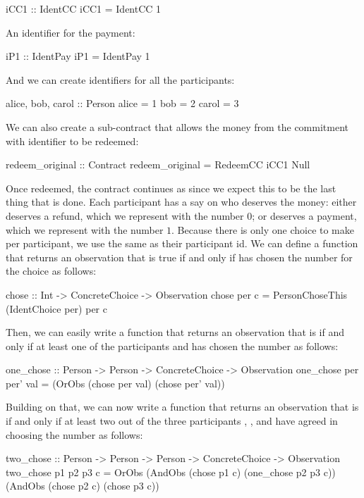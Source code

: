 \documentclass[runningheads]{llncs}
\begin{document}
\begin{haskellcode}
iCC1 :: IdentCC
iCC1 = IdentCC 1
\end{haskellcode}
An identifier for the payment:
\begin{haskellcode}
iP1 :: IdentPay
iP1 = IdentPay 1
\end{haskellcode}
And we can create identifiers for all the participants:
\begin{haskellcode}
alice, bob, carol :: Person
alice = 1
bob   = 2
carol = 3
\end{haskellcode}
We can also create a sub-contract that allows the money from the commitment with identifier  
to be redeemed:
\begin{haskellcode}
redeem_original :: Contract
redeem_original = RedeemCC iCC1 Null
\end{haskellcode}
Once redeemed, the contract continues as  since we expect this to be the last thing that is done.
Each participant has a say on who deserves the money: either  deserves a refund, which 
we represent with the number $0$; or  deserves a payment, which we represent with the 
number $1$. Because there is only one choice to make per participant, we use the same  as 
their participant id. We can define a function that returns an observation that is true if and only if
 has chosen the number  for the choice  as follows:
\begin{haskellcode}
chose :: Int -> ConcreteChoice -> Observation
chose per c = PersonChoseThis (IdentChoice per) per c
\end{haskellcode}
Then, we can easily write a function that returns an observation that is  if and only if at least 
one of the participants  and  has chosen the number  as 
follows:
\begin{haskellcode}
one_chose :: Person -> Person -> ConcreteChoice -> Observation
one_chose per per' val = (OrObs (chose per val) (chose per' val)) 
\end{haskellcode}
Building on that, we can now write a function that returns an observation that is  if and only if 
at least two out of the three participants , , and  have agreed 
in choosing the number  as follows:
\begin{haskellcode}
two_chose :: Person -> Person -> Person -> ConcreteChoice -> Observation
two_chose p1 p2 p3 c = OrObs (AndObs (chose p1 c) (one_chose p2 p3 c))
                             (AndObs (chose p2 c) (chose p3 c))
\end{haskellcode}
\end{document}
